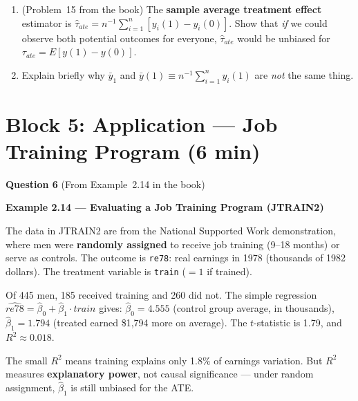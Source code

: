 \documentclass[11pt,a4paper]{article}
\begin{document}
\begin{enumerate}[label=(\alph*)]
\newpage
\item (Problem~15 from the book) The \textbf{sample average treatment effect} estimator is $\hat{\tau}_{ate} = n^{-1}\sum_{i=1}^{n}[y_i(1) - y_i(0)]$. Show that \emph{if} we could observe both potential outcomes for everyone, $\hat{\tau}_{ate}$ would be unbiased for $\tau_{ate} = E[y(1) - y(0)]$.

\begin{answerbox}
\vspace{6cm}
\end{answerbox}

\item Explain briefly why $\bar{y}_1$ and $\bar{y}(1) \equiv n^{-1}\sum_{i=1}^{n} y_i(1)$ are \emph{not} the same thing.

\begin{answerbox}
\vspace{4cm}
\end{answerbox}
\end{enumerate}

\section{Block 5: Application --- Job Training Program \textnormal{(6 min)}}

\textbf{Question 6} (From Example~2.14 in the book)

\begin{bookexample}
\textbf{\color{blockcolor}Example 2.14 --- Evaluating a Job Training Program (JTRAIN2)}

\smallskip
The data in JTRAIN2 are from the National Supported Work demonstration, where men were \textbf{randomly assigned} to receive job training (9--18 months) or serve as controls. The outcome is \texttt{re78}: real earnings in 1978 (thousands of 1982 dollars). The treatment variable is \texttt{train} ($= 1$ if trained).

Of 445 men, 185 received training and 260 did not. The simple regression $\widehat{re78} = \hat{\beta}_0 + \hat{\beta}_1 \cdot train$ gives: $\hat{\beta}_0 = 4.555$ (control group average, in thousands), $\hat{\beta}_1 = 1.794$ (treated earned \$1{,}794 more on average). The $t$-statistic is 1.79, and $R^2 \approx 0.018$.

The small $R^2$ means training explains only 1.8\% of earnings variation. But $R^2$ measures \textbf{explanatory power}, not causal significance --- under random assignment, $\hat{\beta}_1$ is still unbiased for the ATE.
\end{bookexample}
\end{document}
